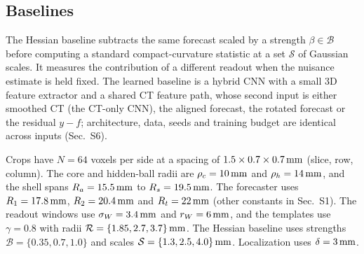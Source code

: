 \subsection{Baselines}
\label{sec:baselines}
The Hessian baseline subtracts the same forecast scaled by a strength $\beta\in\mathcal{B}$ before computing a standard compact-curvature statistic at a set $\mathcal{S}$ of Gaussian scales. It measures the contribution of a different readout when the nuisance estimate is held fixed. The learned baseline is a hybrid CNN with a small 3D feature extractor and a shared CT feature path, whose second input is either smoothed CT (the CT-only CNN), the aligned forecast, the rotated forecast or the residual $y-f$; architecture, data, seeds and training budget are identical across inputs (Sec.~S6).

Crops have $N=64$ voxels per side at a spacing of $1.5\times0.7\times0.7\,\mathrm{mm}$ (slice, row, column). The core and hidden-ball radii are $\rho_c=10\,\mathrm{mm}$ and $\rho_h=14\,\mathrm{mm}$, and the shell spans $R_a=15.5\,\mathrm{mm}$ to $R_s=19.5\,\mathrm{mm}$. The forecaster uses $R_1=17.8\,\mathrm{mm}$, $R_2=20.4\,\mathrm{mm}$ and $R_t=22\,\mathrm{mm}$ (other constants in Sec.~S1). The readout windows use $\sigma_W=3.4\,\mathrm{mm}$ and $r_W=6\,\mathrm{mm}$, and the templates use $\gamma=0.8$ with radii $\mathcal{R}=\{1.85,2.7,3.7\}\,\mathrm{mm}$. The Hessian baseline uses strengths $\mathcal{B}=\{0.35,0.7,1.0\}$ and scales $\mathcal{S}=\{1.3,2.5,4.0\}\,\mathrm{mm}$. Localization uses $\delta=3\,\mathrm{mm}$.
